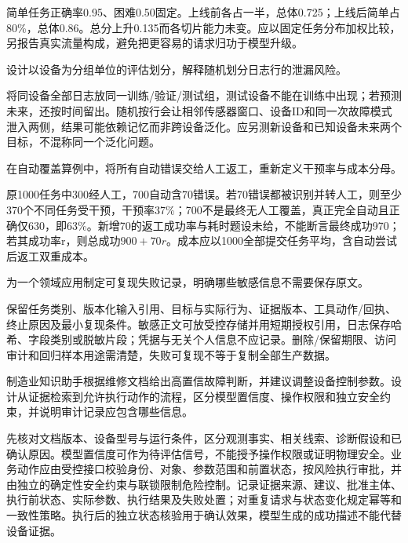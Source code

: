 \begin{exercises}
\begin{exercise}
\begin{solution}
简单任务正确率0.95、困难0.50固定。上线前各占一半，总体0.725；上线后简单占80\%，总体0.86。总分上升0.135而各切片能力未变。应以固定任务分布加权比较，另报告真实流量构成，避免把更容易的请求归功于模型升级。
\end{solution}
\end{exercise}

\begin{exercise}\optional 设计以设备为分组单位的评估划分，解释随机划分日志行的泄漏风险。

\begin{solution}
将同设备全部日志放同一训练/验证/测试组，测试设备不能在训练中出现；若预测未来，还按时间留出。随机按行会让相邻传感器窗口、设备ID和同一次故障模式泄入两侧，结果可能依赖记忆而非跨设备泛化。应另测新设备和已知设备未来两个目标，不混称同一个泛化问题。
\end{solution}
\end{exercise}

\begin{exercise} 在自动覆盖算例中，将所有自动错误交给人工返工，重新定义干预率与成本分母。

\begin{solution}
原1000任务中300经人工，700自动含70错误。若70错误都被识别并转人工，则至少370个不同任务受干预，干预率37\%；700不是最终无人工覆盖，真正完全自动且正确仅630，即63\%。新增70的返工成功率与耗时题设未给，不能断言最终成功970；若其成功率r，则总成功$900+70r$。成本应以1000全部提交任务平均，含自动尝试后返工双重成本。
\end{solution}
\end{exercise}

\begin{exercise} 为一个领域应用制定可复现失败记录，明确哪些敏感信息不需要保存原文。

\begin{solution}
保留任务类别、版本化输入引用、目标与实际行为、证据版本、工具动作/回执、终止原因及最小复现条件。敏感正文可放受控存储并用短期授权引用，日志保存哈希、字段类别或脱敏片段；凭据与无关个人信息不应记录。删除/保留期限、访问审计和回归样本用途需清楚，失败可复现不等于复制全部生产数据。
\end{solution}
\end{exercise}

\begin{exercise} 制造业知识助手根据维修文档给出高置信故障判断，并建议调整设备控制参数。设计从证据检索到允许执行动作的流程，区分模型置信度、操作权限和独立安全约束，并说明审计记录应包含哪些信息。

\begin{solution}
先核对文档版本、设备型号与运行条件，区分观测事实、相关线索、诊断假设和已确认原因。模型置信度可作为待评估信号，不能授予操作权限或证明物理安全。业务动作应由受控接口校验身份、对象、参数范围和前置状态，按风险执行审批，并由独立的确定性安全约束与联锁限制危险控制。记录证据来源、建议、批准主体、执行前状态、实际参数、执行结果及失败处置；对重复请求与状态变化规定幂等和一致性策略。执行后的独立状态核验用于确认效果，模型生成的成功描述不能代替设备证据。
\end{solution}
\end{exercise}

\end{exercises}
